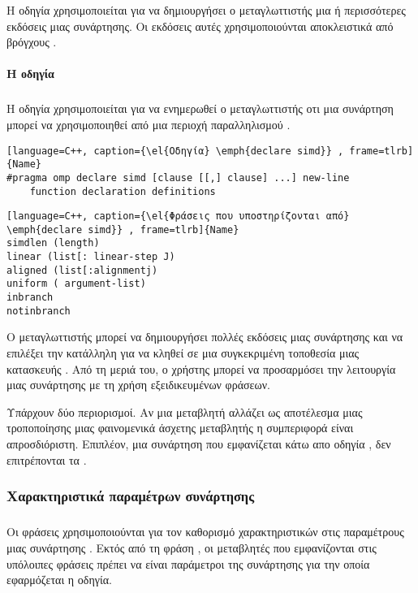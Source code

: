 Η οδηγία \emph{} χρησιμοποιείται για να δημιουργήσει ο μεταγλωττιστής μια ή περισσότερες
\emph{} εκδόσεις μιας συνάρτησης. Οι εκδόσεις αυτές χρησιμοποιούνται αποκλειστικά από βρόγχους
\emph{}.


\paragraph{H οδηγία \emph{}}
\subparagraph{}
Η οδηγία \emph{} χρησιμοποιείται για να ενημερωθεί ο μεταγλωττιστής οτι μια συνάρτηση μπορεί να
χρησιμοποιηθεί από μια περιοχή παραλληλισμού \emph{}.

\begin{lstlisting}[language=C++, caption={\el{Οδηγία} \emph{declare simd}} , frame=tlrb]{Name}
#pragma omp declare simd [clause [[,] clause] ...] new-line
	function declaration definitions
\end{lstlisting}

\begin{lstlisting}[language=C++, caption={\el{Φράσεις που υποστηρίζονται από} \emph{declare simd}} , frame=tlrb]{Name}
simdlen (length)
linear (list[: linear-step J)
aligned (list[:alignmentj)
uniform ( argument-list)
inbranch
notinbranch
\end{lstlisting}

Ο μεταγλωττιστής μπορεί να δημιουργήσει πολλές \emph{} εκδόσεις  μιας συνάρτησης και να επιλέξει την κατάλληλη
για να κληθεί σε μια συγκεκριμένη τοποθεσία μιας κατασκευής \emph{}. Από τη μεριά του, ο χρήστης μπορεί να
προσαρμόσει την λειτουργία μιας συνάρτησης με τη χρήση εξειδικευμένων φράσεων.

Υπάρχουν δύο περιορισμοί. Αν μια μεταβλητή αλλάζει ως αποτέλεσμα μιας τροποποίησης μιας φαινομενικά άσχετης μεταβλητής η
συμπεριφορά είναι απροσδιόριστη. Επιπλέον, μια συνάρτηση που εμφανίζεται κάτω απο οδηγία \emph{}, δεν
επιτρέπονται τα \emph{}.



\subsubsection{Χαρακτηριστικά παραμέτρων συνάρτησης \emph{}}
\subparagraph{}
Οι φράσεις \emph{} χρησιμοποιούνται για τον καθορισμό χαρακτηριστικών στις
παραμέτρους μιας συνάρτησης \emph{}. Εκτός από τη φράση \emph{}, οι μεταβλητές που εμφανίζονται
στις υπόλοιπες φράσεις πρέπει να είναι παράμετροι της συνάρτησης για την οποία εφαρμόζεται η οδηγία.

